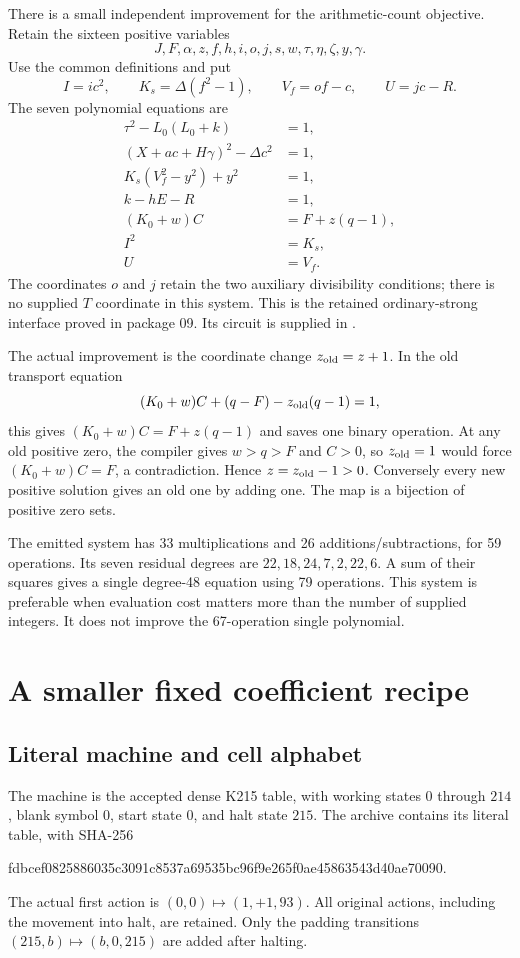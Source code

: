 \documentclass[11pt,letterpaper]{article}
\theoremstyle{remark}\newtheorem{remark}[theorem]{Remark}
\newcommand{\pathtext}[1]{\texttt{\detokenize{#1}}}
\begin{document}
There is a small independent improvement for the arithmetic-count objective.
Retain the sixteen positive variables
\[
 J,F,\alpha,z,f,h,i,o,j,s,w,\tau,\eta,\zeta,y,\gamma.
\]
Use the common definitions and put
\[
 I=ic^2,\qquad K_s=\Delta(f^2-1),\qquad V_f=of-c,\qquad U=jc-R.
\]
The seven polynomial equations are
\begin{align}
 \tau^2-L_0(L_0+k)&=1,\nonumber\\
 (X+ac+H\gamma)^2-\Delta c^2&=1,\nonumber\\
 K_s(V_f^2-y^2)+y^2&=1,\nonumber\\
 k-hE-R&=1,\label{eq:s59}\\
 (K_0+w)C&=F+z(q-1),\nonumber\\
 I^2&=K_s,\nonumber\\
 U&=V_f.\nonumber
\end{align}
The coordinates $o$ and $j$ retain the two auxiliary divisibility conditions;
there is no supplied $T$ coordinate in this system. This is the retained
ordinary-strong interface proved in package 09. Its circuit is supplied in
\pathtext{data/retained16_system59.json}.

The actual improvement is the coordinate change $z_{\rm old}=z+1$.
In the old transport equation
\[
 (K_0+w)C+(q-F)-z_{\rm old}(q-1)=1,
\]
this gives $(K_0+w)C=F+z(q-1)$ and saves one binary operation. At any old
positive zero, the compiler gives $w>q>F$ and $C>0$, so $z_{\rm old}=1$
would force $(K_0+w)C=F$, a contradiction. Hence $z=z_{\rm old}-1>0$.
Conversely every new positive solution gives an old one by adding one.
The map is a bijection of positive zero sets.

The emitted system has 33 multiplications and 26 additions/subtractions,
for 59 operations. Its seven residual degrees are $22,18,24,7,2,22,6$.
A sum of their squares gives a single degree-48 equation using 79 operations.
This system is preferable when evaluation cost matters more than the number
of supplied integers. It does not improve the 67-operation single polynomial.

\section{A smaller fixed coefficient recipe}\label{sec:coefficients}

\subsection{Literal machine and cell alphabet}
The machine is the accepted dense K215 table, with working states $0$ through
$214$, blank symbol $0$, start state $0$, and halt state $215$. The archive
contains its literal table, with SHA-256
\begin{center}\footnotesize\ttfamily
fdbcef0825886035c3091c8537a69535bc96f9e265f0ae45863543d40ae70090.
\end{center}
The actual first action is $(0,0)\mapsto(1,+1,93)$. All original actions,
including the movement into halt, are retained. Only the padding transitions
$(215,b)\mapsto(b,0,215)$ are added after halting.
\end{document}

